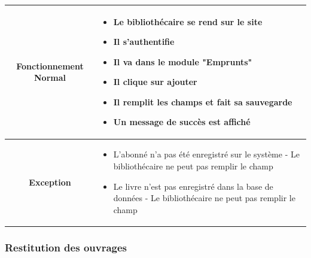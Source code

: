 \par 
\begin{tabular}{|c|p{7cm}|}
        \hline
        \textbf{Fonctionnement Normal} & \begin{itemize}
                \item Le bibliothécaire se rend sur le site
                \item Il s'authentifie
                \item Il va dans le module "Emprunts"
                \item Il clique sur ajouter
                \item Il remplit les champs et fait sa sauvegarde
                \item Un message de succès est affiché
        \end{itemize} \\
        \hline
        \textbf{Exception} & \begin{itemize}
                \item L'abonné n'a pas été enregistré sur le système - Le bibliothécaire 
                ne peut pas remplir le champ
                \item Le livre n'est pas enregistré dans la base de données - Le 
                bibliothécaire ne peut pas remplir le champ
        \end{itemize} \\
        \hline
\end{tabular}


\subsubsection{Restitution des ouvrages} 
